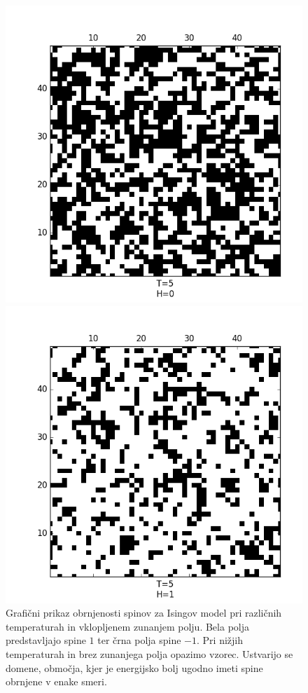 \documentclass[slovene,11pt,a4paper]{article}
\numberwithin{equation}{section} %
\numberwithin{figure}{section} %
\numberwithin{table}{section} %
\begin{document}
\begin{figure}[!ht]
\begin{minipage}{0.5\textwidth}
\end{minipage}
\begin{minipage}{0.5\textwidth}
\centering
\includegraphics[scale=0.5]{slike/zunanje0T5plus.png}
\end{minipage}\hfill
\begin{minipage}{0.5\textwidth}
\centering
\includegraphics[scale=0.5]{slike/zunanje1T5plus.png}
\end{minipage}
\caption{Grafični prikaz obrnjenosti spinov za Isingov model pri različnih temperaturah in vklopljenem zunanjem polju. Bela polja predstavljajo spine $1$ ter črna polja spine $-1$. Pri nižjih temperaturah in brez zunanjega polja opazimo vzorec. Ustvarijo se domene, območja, kjer je energijsko bolj ugodno imeti spine obrnjene v enake smeri.}
\end{figure}
\end{document}
